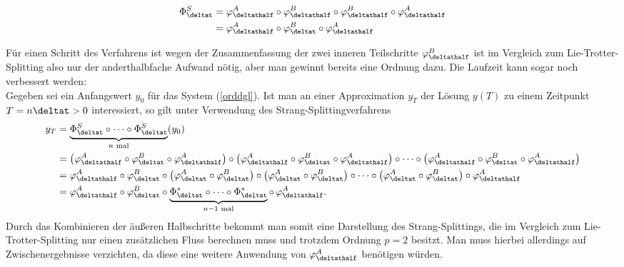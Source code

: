 \noindent\begin{minipage}{0.3\textwidth}

\end{minipage}%
\hfill%
\begin{minipage}{0.7\textwidth}
\begin{align}
\Phi_{\deltat}^S&=\varphi_{\deltathalf}^A\circ\varphi_{\deltathalf}^B\circ\varphi_{\deltathalf}^B\circ\varphi_{\deltathalf}^A\nonumber\\
&=\varphi_{\deltathalf}^A\circ\varphi_{\deltat}^B\circ\varphi_{\deltathalf}^A
\end{align}
\end{minipage}
Für einen Schritt des Verfahrens ist wegen der Zusammenfassung der zwei inneren Teilschritte $\varphi_{\deltathalf}^B$ ist im Vergleich zum Lie-Trotter-Splitting also nur der anderthalbfache Aufwand nötig, aber man gewinnt bereits eine Ordnung dazu. Die Laufzeit kann sogar noch verbessert werden:\\
Gegeben sei ein Anfangswert $y_0$ für das System (\ref{orddgl}). Ist man an einer Approximation $y_T$ der Lösung $y(T)$ zu einem Zeitpunkt $T=n\deltat>0$ interessiert, so gilt unter Verwendung des Strang-Splittingverfahrens
\begin{align*}
y_T&=\underbrace{\Phi_{\deltat}^S\circ\dots\circ\Phi_{\deltat}^S}_{n\text{ mal}}(y_0)\\
&=\left(\varphi_{\deltathalf}^A\circ\varphi_{\deltat}^B\circ\varphi_{\deltathalf}^A\right)\circ\left(
\varphi_{\deltathalf}^A\circ\varphi_{\deltat}^B\circ\varphi_{\deltathalf}^A\right)\circ\dots\circ\left(
\varphi_{\deltathalf}^A\circ\varphi_{\deltat}^B\circ\varphi_{\deltathalf}^A\right)\\
&=\varphi_{\deltathalf}^A\circ\varphi_{\deltat}^B\circ\left(\varphi_{\deltat}^A\circ\varphi_{\deltat}^B\right)\circ\left(\varphi_{\deltat}^A\circ\varphi_{\deltat}^B\right)\circ\dots\circ\left(\varphi_{\deltat}^A\circ\varphi_{\deltat}^B\right)\circ\varphi_{\deltathalf}^A\\
&=\varphi_{\deltathalf}^A\circ\varphi_{\deltat}^B\circ
\underbrace{\Phi_{\deltat}^*\circ\dots\circ\Phi_{\deltat}^*}_{n-1\text{ mal}}\circ\,\varphi_{\deltathalf}^A.
\end{align*}
Durch das Kombinieren der äußeren Halbschritte bekommt man somit eine Darstellung des Strang-Splittings, die im Vergleich zum Lie-Trotter-Splitting nur einen zusätzlichen Fluss berechnen muss und trotzdem Ordnung $p=2$ besitzt. Man muss hierbei allerdings auf Zwischenergebnisse verzichten, da diese eine weitere Anwendung von $\varphi_{\deltathalf}^A$ benötigen würden.\\[0.5cm]
